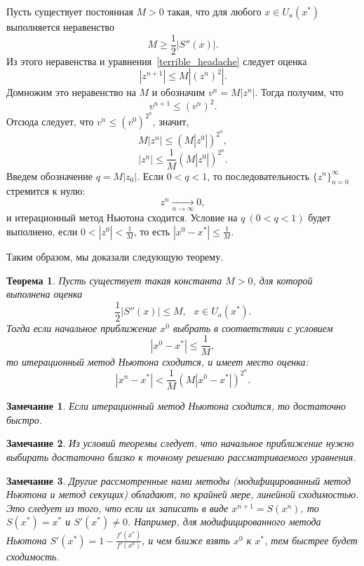 \documentclass[11pt,a4paper,twoside,listtotoc,bibtotoc]{report}
\numberwithin{equation}{section}
\theoremstyle{definition}
\theoremstyle{plain}
\newtheorem{theorem}{Теорема}[section]
\newtheorem{note}{Замечание}[section]
\begin{document}
Пусть существует постоянная $M > 0$ такая, что для любого $x \in U_a(x^*)$
выполняется неравенство
%
\begin{equation}
%
    \label{how_i_met_your_mother}
    M \geqslant \frac{1}{2}\left|S''(x)\right|.
%
\end{equation}
%
Из этого неравенства и уравнения~\eqref{terrible_headache} следует оценка
%
$$
    |z^{n+1}| \leqslant M|(z^n)^2|.
$$
%
Домножим это неравенство на $M$ и обозначим $v^n = M|z^n|$.
Тогда получим, что
%
\begin{equation}
%
    \label{big_bang_theory}
    v^{n+1} \leqslant (v^n)^2.
%
\end{equation}
%
Отсюда следует, что $v^n \leqslant (v^0)^{2^n}$, значит,
%
$$
    M|z^n| \leqslant \left(M\left|z^0\right|\right)^{2^n},
$$
%
%
$$
    |z^n| \leqslant \frac{1}{M} \left(M\left|z^0\right|\right)^{2^n}.
$$
%
Введем обозначение $q = M|z_0|$. Если $0< q < 1$,
то последовательность $\{z^n\}_{n=0}^\infty$ стремится к нулю:
%
$$
    z^n \underset{n\rightarrow\infty}\longrightarrow 0,
$$
%
и итерационный метод Ньютона сходится. Условие на $q~(0<q<1)$ будет выполнено,
если $0<|z^0|<\frac{1}{M}$, то есть $|x^0 - x^*| \leqslant \frac{1}{M}$.

\vspace{3mm}
Таким образом, мы доказали следующую теорему.
%
\begin{theorem}
%
    Пусть существует такая константа $M > 0$, для которой выполнена оценка
    $$
         \frac{1}{2}\left|S''(x)\right| \leqslant M, ~~~x \in U_a(x^*).
    $$
    Тогда если начальное приближение $x^0$ выбрать в соответствии с условием
    $$
        |x^0 - x^*| \leqslant \frac{1}{M},
    $$
    то итерационный метод Ньютона сходится, и имеет место оценка:
    $$
     |x^n - x^*| < \frac{1}{M}\left(M|x^0 - x^*|\right)^{2^n}.
    $$
%
\end{theorem}
%
%
\begin{note}
%
    Если итерационный метод Ньютона сходится, то достаточно быстро.
%
\end{note}
%
%
\begin{note}
%
    Из условий теоремы следует, что начальное приближение нужно выбирать
    достаточно близко к точному решению рассматриваемого уравнения.
%
\end{note}
%
%
\begin{note}
%
    Другие рассмотренные нами методы (модифицированный метод Ньютона и
    метод секущих) обладают, по крайней мере, линейной сходимостью. Это
    следует из того, что если их записать в виде $x^{n+1} = S(x^n)$, то
    $S(x^*) = x^*$ и $S'(x^*) \neq 0$. Например, для модифицированного
    метода Ньютона $S'(x^*) = 1 - \frac{f'(x^*)}{f'(x^0)}$, и чем ближе
    взять $x^0$ к $x^*$, тем быстрее будет сходимость.
\end{note}
%
\newpage
%
%
\end{document}
